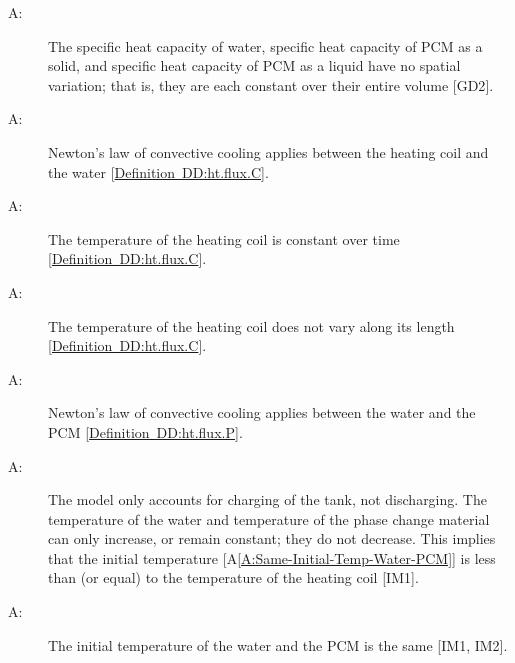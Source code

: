 \documentclass[12pt]{article}
\newcounter{assumpnum}
\newcommand{\atheassumpnum}{A\theassumpnum}
\begin{document}
\begin{description}
\item[\atheassumpnum\label{A:Specific-Heat-Energy-Constant-over-Volume}:]The specific heat capacity of water, specific heat capacity of PCM as a solid, and specific heat capacity of PCM as a liquid have no spatial variation; that is, they are each constant over their entire volume {[}GD2{]}.
\end{description}
\begin{description}
\item[\atheassumpnum\label{A:Newton-Law-Convective-Cooling-Coil-Water}:]Newton's law of convective cooling applies between the heating coil and the water {[}\hyperref[DD:ht.flux.C]{Definition~DD:ht.flux.C}{]}.
\end{description}
\begin{description}
\item[\atheassumpnum\label{A:Temp-Heating-Coil-Constant-over-Time}:]The temperature of the heating coil is constant over time {[}\hyperref[DD:ht.flux.C]{Definition~DD:ht.flux.C}{]}.
\end{description}
\begin{description}
\item[\atheassumpnum\label{A:Temp-Heating-Coil-Constant-over-Length}:]The temperature of the heating coil does not vary along its length {[}\hyperref[DD:ht.flux.C]{Definition~DD:ht.flux.C}{]}.
\end{description}
\begin{description}
\item[\atheassumpnum\label{A:Law-Convective-Cooling-Water-PCM}:]Newton's law of convective cooling applies between the water and the PCM {[}\hyperref[DD:ht.flux.P]{Definition~DD:ht.flux.P}{]}.
\end{description}
\begin{description}
\item[\atheassumpnum\label{A:Charging-Tank-No-Temp-Discharge}:]The model only accounts for charging of the tank, not discharging. The temperature of the water and temperature of the phase change material can only increase, or remain constant; they do not decrease. This implies that the initial temperature {[}A\ref{A:Same-Initial-Temp-Water-PCM}{]} is less than (or equal) to the temperature of the heating coil {[}IM1{]}.
\end{description}
\begin{description}
\item[\atheassumpnum\label{A:Same-Initial-Temp-Water-PCM}:]The initial temperature of the water and the PCM is the same {[}IM1, IM2{]}.
\end{description}
\end{document}
